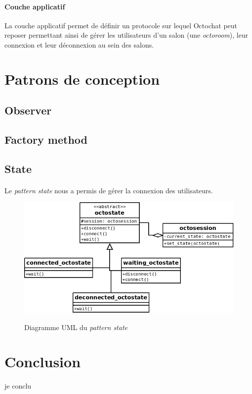 \documentclass[a4paper]{article}
\begin{document}
			\paragraph{Couche applicatif}{
			La couche applicatif permet de définir un protocole sur lequel Octochat peut reposer permettant ainsi 
			de gérer les utilisateurs d'un salon (une \textit{octoroom}), leur connexion et leur déconnexion au sein
			des salons.
			}
		\newpage
		
	\section{Patrons de conception}
		\subsection{Observer}
		\subsection{Factory method}
		\subsection{State}
			\paragraph{}{
			Le \textit{pattern state} nous a permis de gérer la connexion des utilisateurs.
			}
			\begin{center}
				\begin{figure}
					\includegraphics[scale=0.6]{UML/state.png}
					\label{state_uml}
					\caption{Diagramme UML du \textit{pattern state}}
				\end{figure}
			\end{center}
	\newpage
	
	\section*{Conclusion}
		\paragraph{}{je conclu}
		
\end{document}
